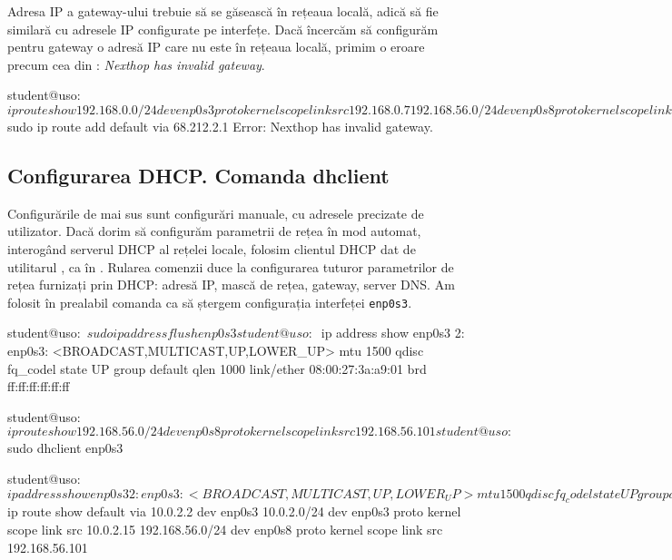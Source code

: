 Adresa IP a gateway-ului trebuie să se găsească în rețeaua locală, adică să fie similară cu adresele IP configurate pe interfețe.
Dacă încercăm să configurăm pentru gateway o adresă IP care nu este în rețeaua locală, primim o eroare precum cea din : \textit{Nexthop has invalid gateway}.

\begin{screen}[caption={Configurare gateway-ului cu adresă IP nevalidă},label={lst:net:add-gw-err}]
student@uso:~$ ip route show
192.168.0.0/24 dev enp0s3 proto kernel scope link src 192.168.0.7 
192.168.56.0/24 dev enp0s8 proto kernel scope link src 192.168.56.101 

student@uso:~$ sudo ip route add default via 68.212.2.1
Error: Nexthop has invalid gateway.
\end{screen}

\subsection{Configurarea DHCP. Comanda dhclient}
\label{sec:net:dhclient}

Configurările de mai sus sunt configurări manuale, cu adresele precizate de utilizator.
Dacă dorim să configurăm parametrii de rețea în mod automat, interogând serverul DHCP al rețelei locale, folosim clientul DHCP dat de utilitarul , ca în .
Rularea comenzii  duce la configurarea tuturor parametrilor de rețea furnizați prin DHCP: adresă IP, mască de rețea, gateway, server DNS.
Am folosit în prealabil comanda  ca să ștergem configurația interfeței \texttt{enp0s3}.

\begin{screen}[caption={Configurarea automată (prin DHCP) din linia de comandă},label={lst:net:dhclient}]
student@uso:~$ sudo ip address flush enp0s3

student@uso:~$ ip address show enp0s3
2: enp0s3: <BROADCAST,MULTICAST,UP,LOWER_UP> mtu 1500 qdisc fq_codel state UP group default qlen 1000
    link/ether 08:00:27:3a:a9:01 brd ff:ff:ff:ff:ff:ff

student@uso:~$ ip route show
192.168.56.0/24 dev enp0s8 proto kernel scope link src 192.168.56.101 

student@uso:~$ sudo dhclient enp0s3

student@uso:~$ ip address show enp0s3
2: enp0s3: <BROADCAST,MULTICAST,UP,LOWER_UP> mtu 1500 qdisc fq_codel state UP group default qlen 1000
    link/ether 08:00:27:3a:a9:01 brd ff:ff:ff:ff:ff:ff
    inet 10.0.2.15/24 brd 10.0.2.255 scope global enp0s3
       valid_lft forever preferred_lft forever

student@uso:~$ ip route show
default via 10.0.2.2 dev enp0s3
10.0.2.0/24 dev enp0s3 proto kernel scope link src 10.0.2.15
192.168.56.0/24 dev enp0s8 proto kernel scope link src 192.168.56.101
\end{screen}

